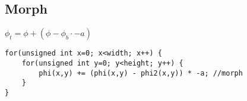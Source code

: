 
\subsection{Morph}

$\phi_t = \phi + (\phi - \phi_b \cdot -a)$

\begin{lstlisting}
for(unsigned int x=0; x<width; x++) {
    for(unsigned int y=0; y<height; y++) {
        phi(x,y) += (phi(x,y) - phi2(x,y)) * -a; //morph
    }
}
\end{lstlisting}



